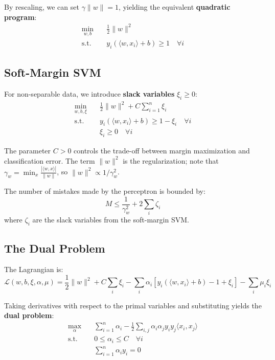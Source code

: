 \documentclass[main.tex]{subfiles}
\begin{document}
By rescaling, we can set $\gamma \|w\| = 1$, yielding the equivalent \textbf{quadratic program}:
$$\begin{aligned}
\min_{w, b} \quad & \frac{1}{2}\|w\|^2 \\
\text{s.t.} \quad & y_i(\langle w, x_i \rangle + b) \geq 1 \quad \forall i
\end{aligned}$$

\subsection{Soft-Margin SVM}

For non-separable data, we introduce \textbf{slack variables} $\xi_i \geq 0$:
$$\begin{aligned}
\min_{w, b, \xi} \quad & \frac{1}{2}\|w\|^2 + C \sum_{i=1}^{n} \xi_i \\
\text{s.t.} \quad & y_i(\langle w, x_i \rangle + b) \geq 1 - \xi_i \quad \forall i \\
& \xi_i \geq 0 \quad \forall i
\end{aligned}$$

The parameter $C > 0$ controls the trade-off between margin maximization and classification error. The term $\|w\|^2$ is the regularization; note that $\gamma_w = \min_x \frac{|\langle w, x \rangle|}{\|w\|}$, so $\|w\|^2 \propto 1/\gamma_w^2$.

\begin{theorem}
The number of mistakes made by the perceptron is bounded by:
$$M \leq \frac{1}{\gamma_w^2} + 2\sum_i \zeta_i$$
where $\zeta_i$ are the slack variables from the soft-margin SVM.
\end{theorem}

\subsection{The Dual Problem}

The Lagrangian is:
$$\mathcal{L}(w, b, \xi, \alpha, \mu) = \frac{1}{2}\|w\|^2 + C\sum_i \xi_i - \sum_i \alpha_i [y_i(\langle w, x_i \rangle + b) - 1 + \xi_i] - \sum_i \mu_i \xi_i$$

Taking derivatives with respect to the primal variables and substituting yields the \textbf{dual problem}:
$$\begin{aligned}
\max_{\alpha} \quad & \sum_{i=1}^{n} \alpha_i - \frac{1}{2} \sum_{i,j} \alpha_i \alpha_j y_i y_j \langle x_i, x_j \rangle \\
\text{s.t.} \quad & 0 \leq \alpha_i \leq C \quad \forall i \\
& \sum_{i=1}^{n} \alpha_i y_i = 0
\end{aligned}$$
\end{document}
